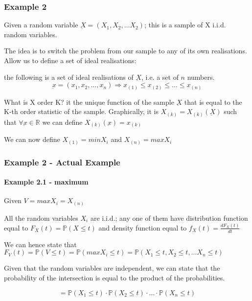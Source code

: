 
\subsubsection{Example 2}

Given a random variable \(\underbar{X} = (X_1, X_2, \ldots X_2)\); this is a sample of X i.i.d. random variables.

The idea is to switch the problem from our sample to any of its own realisations. Allow us to define a set of ideal realisations:

the following is a set of ideal realisations of \(\underbar{X}\), i.e. a set of \(n\) numbers.
\[ \underbar{x} = (x_1, x_2, \ldots, x_n) \Rightarrow x_{(1)} \leq x_{(2)} \leq \ldots \leq x_{(n)} \]

What is X order K? it the unique function of the sample \(\underbar{X}\) that is equal to the K-th order statistic of the sample.
Graphically, it is \( X_{(k)} = X_{(k)}(\underbar{X}) \) such that \( \forall \underbar{x} \in \mathbb{R} \) we can define \(X_{(k)} (\underbar{x}) = x_{(k)} \)

We can now define \( X_{(1)} = min X_i \) and \(X_{(n)} = max X_i \) 


\subsubsection{Example 2 - Actual Example}

    \paragraph{Example 2.1 - maximum}

    Given \(V = max X_i = X_{(n)}\)

    All the random variables \(X_i\) are i.i.d.; any one of them have distribution function equal to \(F_X(t) = \mathbb{P} (X \leq t)\) and density function equal to \(f_X(t) = \frac{dF_X(t)}{dt}\)

    We can hence state that \(F_V(t) = \mathbb{P} (V\leq t) = \mathbb{P} (max X_i \leq t ) = \mathbb{P} (X_1 \leq t, X_2 \leq t, \ldots X_n \leq t)  \)

    Given that the random variables are independent, we can state that the probability of the intersection is equal to the product of the probabilities.

    \[ = \mathbb{P} (X_1 \leq t) \cdot \mathbb{P} (X_2 \leq t) \cdot \ldots \cdot \mathbb{P} (X_n \leq t)\]

